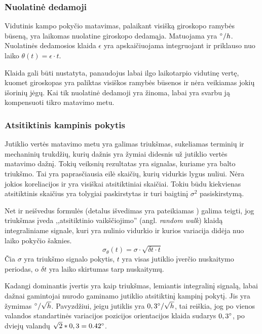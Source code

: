 \subsubsection{Nuolatinė dedamoji}

Vidutinis kampo pokyčio matavimas, palaikant visišką giroskopo ramybės būseną, yra laikomas nuolatine giroskopo dedamąja. 
Matuojama yra $\degree/h$. 
Nuolatinės dedamosios klaida $\epsilon$ yra apskaičiuojama integruojant ir priklauso nuo laiko $\theta(t) = \epsilon \cdot t$.

Klaida gali būti nustatyta, panaudojus labai ilgo laikotarpio vidutinę vertę, kuomet giroskopas yra paliktas visiškos ramybės būsenos ir nėra veikiamas jokių išorinių jėgų. 
Kai tik nuolatinė dedamoji yra žinoma, labai yra svarbu ją kompensuoti tikro matavimo metu.

\subsubsection{Atsitiktinis kampinis pokytis}

Jutiklio vertės matavimo metu yra galimas triukšmas, sukeliamas terminių ir mechaninių trukdžių, kurių dažnis yra žymiai didesnis už jutiklio vertės matavimo dažnį.
Tokių veiksnių rezultatas yra signalas, kuriame yra balto triukšmo. 
Tai yra paprasčiausia eilė skaičių, kurių vidurkis lygus nuliui.
Nėra jokios koreliacijos ir yra visiškai atsitiktiniai skaičiai. 
Tokiu būdu kiekvienas atsitiktinis skaičius yra tolygiai paskirstytas ir turi baigtinį $\sigma^2$ pasiskirstymą.

Net ir neišvedus formulės (detalus išvedimas yra pateikiamas \cite{woodman2007introduction}) galima teigti, jog triukšmas įveda ,,atsitiktinio vaikščiojimo'' (angl. \textit{random walk}) klaidą integraliniame signale, kuri yra nulinio vidurkio ir kurios variacija didėja nuo laiko pokyčio šaknies.
\begin{equation}
    \sigma_{\theta} (t) = \sigma \cdot \sqrt{ \delta t \cdot t}
\end{equation}
Čia $\sigma$ yra triukšmo signalo pokytis, $t$ yra visas jutiklio įverčio nuskaitymo periodas, o $\delta t$ yra laiko skirtumas tarp nuskaitymų.

Kadangi dominantis įvertis yra kaip triukšmas, lemiantis integralinį signalą, labai dažnai gamintojai nurodo gaminamo jutiklio atsitiktinį kampinį pokytį. Jis yra žymimas $\degree/\sqrt{h}$. 
Pavyzdžiui, jeigu jutiklis yra $0,3\degree / \sqrt{h}$, tai reiškia, jog po vienos valandos standartinės variacijos pozicijos orientacijos klaida sudarys $0,3\degree$, po dviejų valandų $\sqrt{2} * 0,3 = 0.42 \degree$.

